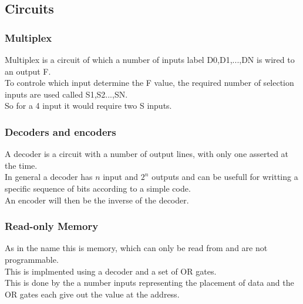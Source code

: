 \documentclass[12pt, a4paper]{article}
\begin{document}
			\subsection{Circuits}
				\subsubsection{Multiplex}
					Multiplex is a circuit of which a number of inputs label D0,D1,...,DN is wired to an output F.\\
					To controle which input determine the F value, the required number of selection inputs are used called S1,S2...,SN.\\
					So for a 4 input it would require two S inputs.\\
				\subsubsection{Decoders and encoders}
					A decoder is a circuit with a number of output lines, with only one asserted at the time.\\
					In general a decoder has $n$ input and $2^n$ outputs and can be usefull for writting a specific sequence of bits according to a simple code.\\
					An encoder will then be the inverse of the decoder.
				\subsubsection{Read-only Memory}
					As in the name this is memory, which can only be read from and are not programmable.\\
					This is implmented using a decoder and a set of OR gates.\\
					This is done by the a number inputs representing the placement of data and the OR gates each give out the value at the address.
\end{document}
